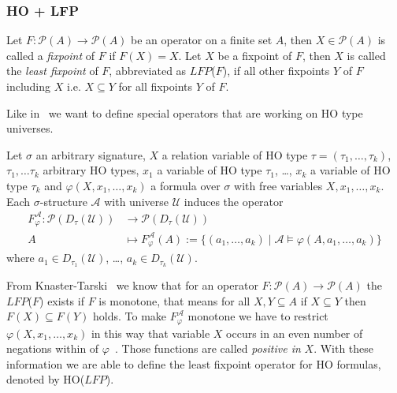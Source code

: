 \subsubsection{HO + LFP}

\begin{definition}
   Let $F: \mathscr{P}(A) \rightarrow \mathscr{P}(A)$ be an operator on a finite set $A$, then $X \in \mathscr{P}(A)$
   is called a \emph{fixpoint} of $F$ if $F(X) = X$. Let $X$ be a fixpoint of $F$, then $X$ is called the \emph{least
   fixpoint} of $F$, abbreviated as $\mathit{LFP}$($F$), if all other fixpoints $Y$ of $F$ including $X$ i.e. $X
   \subseteq Y$ for all fixpoints $Y$ of $F$.
\end{definition}

Like in~\cite{freireMartins2011descriptive} we want to define special operators that are working on HO type
universes.

\begin{definition}
    Let $\sigma$ an arbitrary signature, $X$ a relation variable of HO type $\tau = (\tau_1, \dots, \tau_k)$,
    $\tau_1, \dots \tau_k$ arbitrary HO types, $x_1$ a variable of HO type $\tau_1$, \dots, $x_k$ a
    variable of HO type $\tau_k$ and $\varphi(X, x_1, \dots, x_k)$ a formula over $\sigma$ with free variables $X, x_1,
    \dots, x_k$. Each $\sigma$-structure $\mathcal{A}$ with universe $\mathcal{U}$ induces the operator
    \begin{align*}
        F_\varphi^\mathcal{A} : \mathscr{P}(D_\tau(\mathcal{U})) &\longrightarrow \mathscr{P}(D_\tau(\mathcal{U}))\\
        A &\longmapsto F_\varphi^\mathcal{A}(A) := \{(a_1, \dots, a_k) \mid \mathcal{A} \models \varphi(A, a_1,
        \dots, a_k)\}
    \end{align*}
    where $a_1 \in D_{\tau_1}(\mathcal{U})$, \dots, $a_k \in D_{\tau_k}(\mathcal{U})$.
\end{definition}

From Knaster-Tarski~\cite{tarski1955lattice} we know that for an operator $F: \mathscr{P}(A) \rightarrow \mathscr{P}
(A)$ the $\mathit{LFP}$($F$) exists if $F$ is monotone, that means for all $X, Y \subseteq A$ if $X \subseteq Y$ then
$F(X) \subseteq F(Y)$ holds. To make $F_\varphi^\mathcal{A}$ monotone we have to restrict $\varphi(X, x_1, \dots,
x_k)$ in this way that variable $X$ occurs in an even number of negations within of
$\varphi$~\cite{freireMartins2011descriptive}. Those functions are called \textit{positive in} $X$. With these
information we are able to define the least fixpoint operator for HO formulas, denoted by HO($\mathit{LFP}$).

